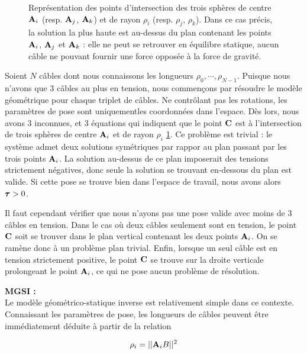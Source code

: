 \begin{figure}[!ht]
  \centering
    \def\svgwidth{.85\linewidth}
      
    \caption{\footnotesize{Repr\'esentation des points d'intersection des 
trois sph\`eres de centre ${\bf A}_i$ (resp. ${\bf A}_j$, ${\bf A}_k$) et de 
rayon $\rho_i$ (resp. $\rho_j$, $\rho_k$). Dans ce cas pr\'ecis, la solution la 
plus haute est au-dessus du plan contenant les points ${\bf A}_i$, ${\bf 
A}_j$ et ${\bf A}_k$ : elle ne peut se retrouver en \'equilibre statique, 
aucun c\^able ne pouvant fournir une force oppos\'ee \`a la force de 
gravit\'e.}}
\label{intro:fig6b}
\end{figure}

Soient $N$ c\^ables dont nous connaissons les longueurs $\rho_0, \cdots, 
\rho_{N-1}$. Puisque nous n'avons que $3$ c\^ables au plus en tension, nous 
commen\c cons par r\'esoudre le mod\`ele g\'eom\'etrique pour chaque 
triplet de c\^ables. Ne contr\^olant pas les rotations, les param\`etres de 
pose sont uniquementles coordonn\'ees dans l'espace. D\`es lors, nous avons $3$ 
inconnues, et $3$ \'equations qui indiquent que le point $\bf C$ est à l'intersection de trois sph\`eres de centre ${\bf A}_i$ 
et de rayon $\rho_i$ \ref{intro:fig6b}. Ce problème est trivial : le système admet deux solutions symétriques par rappor au plan passant par les trois points ${\bf A}_i$. La solution au-dessus de ce plan imposerait des tensions strictement négatives, donc seule la solution se trouvant en-dessous du plan est valide. Si cette pose se trouve bien dans l'espace de travail, nous avons alors $\hbox{\boldmath $\tau$} > 0$.

Il faut cependant v\'erifier que nous n'ayons pas une pose valide avec moins de 
$3$ c\^ables en tension. Dans le cas où deux câbles seulement sont en tension, le point $\bf C$ soit se trouver dans le plan vertical contenant les deux points ${\bf A}_i$. On se ramène donc à un problème plan trivial. Enfin, lorsque un seul câble est en tension strictement positive, le point ${\bf C}$ se trouve sur la droite verticale prolongeant le point ${\bf A}_i$, ce qui ne pose aucun problème de résolution.

{\bf MGSI :}\\

Le mod\`ele g\'eom\'etrico-statique inverse est relativement simple dans ce 
contexte. Connaissant les param\`etres de pose, les longueurs de c\^ables 
peuvent \^etre imm\'ediatement d\'eduite \`a partir de la relation 

\begin{equation}
\rho_i = ||{\bf A}_iB||^2
\label{intro:eq11a}
\end{equation}

